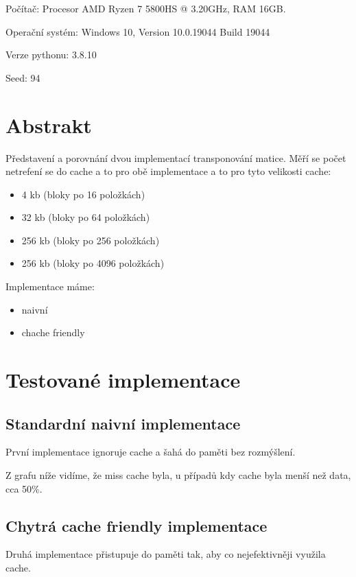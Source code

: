 \documentclass[a4paper]{article}
\author{David Napravnik}
\begin{document}
  \pagestyle{fancy}

	Počítač: Procesor AMD Ryzen 7 5800HS @ 3.20GHz, RAM 16GB.
	
	Operační systém: Windows 10, Version 10.0.19044 Build 19044
	
	Verze pythonu: 3.8.10

    Seed: 94

	\section{Abstrakt}
	Představení a porovnání dvou implementací transponování matice.
	Měří se počet netrefení se do cache a to pro obě implementace a to pro tyto velikosti cache:
	\begin{itemize}
		\item 4 kb (bloky po 16 položkách)
		\item 32 kb (bloky po 64 položkách)
		\item 256 kb (bloky po 256 položkách)	
		\item 256 kb (bloky po 4096 položkách)	
	\end{itemize}
	Implementace máme:
	\begin{itemize}
		\item naivní
		\item chache friendly
	\end{itemize}
	
	\section{Testované implementace}

	\subsection{Standardní naivní implementace}

	První implementace ignoruje cache a šahá do paměti bez rozmýšlení.

	Z grafu níže vidíme, že miss cache byla, u případů kdy cache byla menší než data,
	cca 50\%.

	\subsection{Chytrá cache friendly implementace}

	Druhá implementace přistupuje do paměti tak, aby co nejefektivněji využila cache.
	
\end{document}
